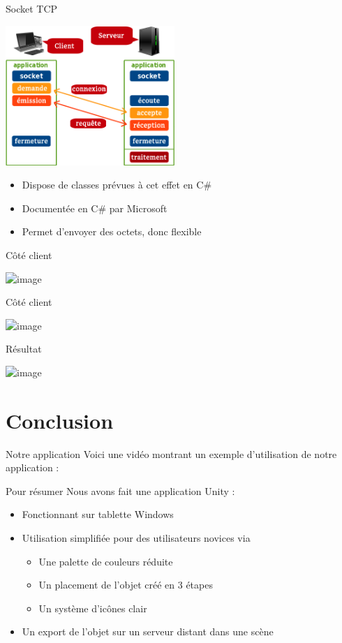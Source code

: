 \documentclass[a4paper,10pt]{beamer}
\begin{document}
	\begin{frame}{Socket TCP}
		\centerline{\includegraphics[height=150pt]{images/network/tcp-socket6.png}}
			\begin{itemize}
				\item Dispose de classes prévues à cet effet en C\# \pause
				\item Documentée en C\# par Microsoft \pause
				\item Permet d'envoyer des octets, donc flexible
			\end{itemize}
	\end{frame}
	
	\begin{frame}{Côté client}
		\centerline{\includegraphics<1>[height=140pt]{images/network/options.png}}
	\end{frame}
	
	\begin{frame}{Côté client}
		\centerline{\includegraphics<1>[height=140pt]{images/network/polandball_3D.png}}
	\end{frame}
	
	\begin{frame}{Résultat}
		\centerline{\includegraphics<1>[height=170pt]{images/network/server.png}}
	\end{frame}
	
	\section{Conclusion}
	
	\begin{frame}{Notre application}
		Voici une vidéo montrant un exemple d'utilisation de notre application :
	\end{frame}
	
	\begin{frame}{Pour résumer}
		Nous avons fait une application Unity :
		\begin{itemize}
			\item Fonctionnant sur tablette Windows
			\item Utilisation simplifiée pour des utilisateurs novices via 
			\begin{itemize}
				\item Une palette de couleurs réduite
				\item Un placement de l'objet créé en 3 étapes
				\item Un système d'icônes clair
			\end{itemize}
			\item Un export de l'objet sur un serveur distant dans une scène
		\end{itemize}
	\end{frame}
		
\end{document}
